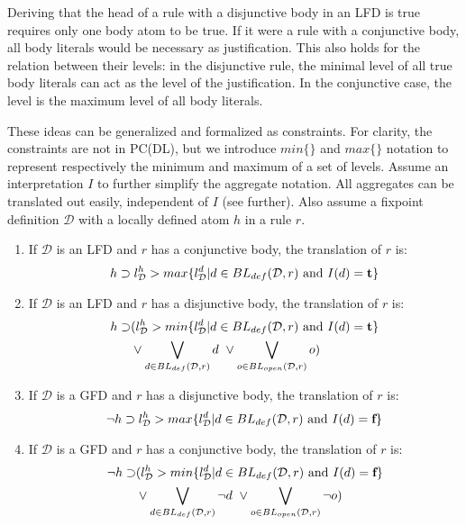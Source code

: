 \documentclass{tlp}
\newcommand{\Tr}{\mbox{\bf t}}
\newcommand{\Fa}{\mbox{\bf f}}
\newcommand{\lev}[2]{\ensuremath{l_{#1}^{#2}}}
\newcommand{\openset}[2]{BL_{open}(#1, #2)}
\newcommand{\defset}[2]{BL_{def}(#1, #2)}
\newcommand{\FD}{\ensuremath{\mathcal{D}}\xspace}
\begin{document}
Deriving that the head of a rule with a disjunctive body in an LFD is true requires only one body atom to be true. If it were a rule with a conjunctive body, all body literals would be necessary as justification. This also holds for the relation between their levels: in the disjunctive rule, the minimal level of all true body literals can act as the level of the justification. In the conjunctive case, the level is the maximum level of all body literals.

These ideas can be generalized and formalized as constraints. For clarity, the constraints are not in PC(DL), but we introduce $min\{\}$ and $max\{\}$ notation to represent respectively the minimum and maximum of a set of levels. Assume an interpretation $I$ to further simplify the aggregate notation. All aggregates can be translated out easily, independent of $I$ (see further). Also assume a fixpoint definition $\FD$ with a locally defined atom $h$ in a rule $r$.
\begin{enumerate}
\item If $\FD$ is an LFD and $r$ has a conjunctive body, the translation of $r$ is:
\begin{equation}\label{eq:maplfdconj}
h \supset \lev{\FD}{h}>max\{\lev{\FD}{d} | d \in \defset{\FD}{r} \ \text{and} \ I(d) =\Tr \}
\end{equation}
\item If $\FD$ is an LFD and $r$ has a disjunctive body, the translation of $r$ is:
\begin{equation}
\begin{split}
h \supset &(\lev{\FD}{h}>min\{\lev{\FD}{d} | d \in \defset{\FD}{r} \ \text{and} \ I(d) = \Tr\} \\ &\lor \bigvee_{d \in \defset{\FD}{r}} d \ \lor \bigvee_{o \in \openset{\FD}{r}} o)
\end{split}
\end{equation}
\item If $\FD$ is a GFD and $r$ has a disjunctive body, the translation of $r$ is:
\begin{equation}
\lnot h \supset \lev{\FD}{h}>max\{\lev{\FD}{d} | d \in \defset{\FD}{r} \ \text{and} \ I(d) = \Fa \}
\end{equation}
\item If $\FD$ is a GFD and $r$ has a conjunctive body, the translation of $r$ is:
\begin{equation}
\begin{split}
\lnot h \supset& (\lev{\FD}{h}>min\{\lev{\FD}{d} | d \in \defset{\FD}{r} \ \text{and} \ I(d) = \Fa \} \\ &\lor \bigvee_{d \in \defset{\FD}{r}} \lnot d \ \lor \bigvee_{o \in \openset{\FD}{r}} \lnot o)
\end{split}
\end{equation}
\end{enumerate}
\end{document}
